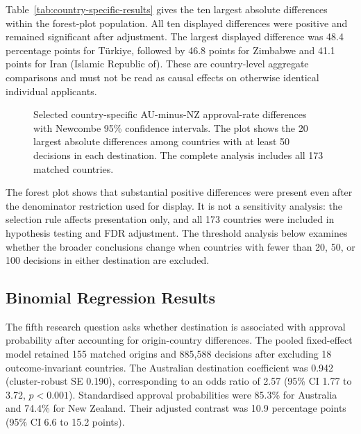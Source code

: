 \documentclass[runningheads]{llncs}
\begin{document}
Table~\ref{tab:country-specific-results} gives the ten largest absolute differences within the forest-plot population. All ten displayed differences were positive and remained significant after adjustment. The largest displayed difference was 48.4 percentage points for Türkiye, followed by 46.8 points for Zimbabwe and 41.1 points for Iran (Islamic Republic of). These are country-level aggregate comparisons and must not be read as causal effects on otherwise identical individual applicants.



\begin{figure}
\centering

\caption{Selected country-specific AU-minus-NZ approval-rate differences with Newcombe 95\% confidence intervals. The plot shows the 20 largest absolute differences among countries with at least 50 decisions in each destination. The complete analysis includes all 173 matched countries.}
\label{fig:country-difference-forest}
\end{figure}

The forest plot shows that substantial positive differences were present even after the denominator restriction used for display. It is not a sensitivity analysis: the selection rule affects presentation only, and all 173 countries were included in hypothesis testing and FDR adjustment. The threshold analysis below examines whether the broader conclusions change when countries with fewer than 20, 50, or 100 decisions in either destination are excluded.

\subsection{Binomial Regression Results}

The fifth research question asks whether destination is associated with approval probability after accounting for origin-country differences. The pooled fixed-effect model retained 155 matched origins and 885,588 decisions after excluding 18 outcome-invariant countries. The Australian destination coefficient was 0.942 (cluster-robust SE 0.190), corresponding to an odds ratio of 2.57 (95\% CI 1.77 to 3.72, $p<0.001$). Standardised approval probabilities were 85.3\% for Australia and 74.4\% for New Zealand. Their adjusted contrast was 10.9 percentage points (95\% CI 6.6 to 15.2 points).


\end{document}
